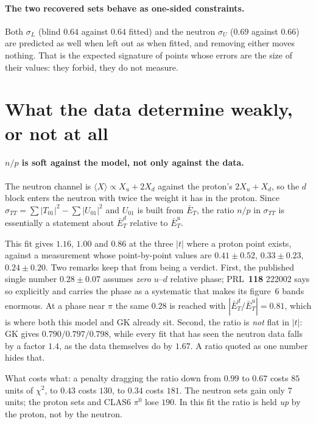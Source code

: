 \documentclass[11pt,a4paper]{article}
\newcommand{\sig}[1]{\sigma_{#1}}
\begin{document}
\paragraph{The two recovered sets behave as one-sided constraints.}  Both
$\sig{L}$ (blind $0.64$ against $0.64$ fitted) and the neutron $\sig{U}$
($0.69$ against $0.66$) are predicted as well when left out as when fitted, and
removing either moves nothing.  That is the expected signature of points whose
errors are the size of their values: they forbid, they do not measure.

\section{What the data determine weakly, or not at all}
\label{sec:notmeasured}

\paragraph{$n/p$ is soft against the model, not only against the data.}
The neutron channel is $\langle X\rangle \propto X_u + 2X_d$ against the
proton's $2X_u + X_d$, so the $d$ block enters the neutron with twice the weight
it has in the proton.  Since $\sig{TT} = \sum|T_{01}|^2 - \sum|U_{01}|^2$ and
$U_{01}$ is built from $\bar E_T$, the ratio $n/p$ in $\sig{TT}$ is essentially a
statement about $\bar E_T^d$ relative to $\bar E_T^u$.

This fit gives $1.16$, $1.00$ and $0.86$ at the three $|t|$ where a proton
point exists, against a measurement whose point-by-point values are
$0.41 \pm 0.52$, $0.33 \pm 0.23$, $0.24 \pm 0.20$.  Two remarks keep that from
being a verdict.  First, the published single number $0.28 \pm 0.07$ assumes
\emph{zero} $u$--$d$ relative phase; PRL~\textbf{118} 222002 says so explicitly
and carries the phase as a systematic that makes its figure~6 bands enormous.
At a phase near $\pi$ the same $0.28$ is reached with
$|\bar E_T^d/\bar E_T^u| = 0.81$, which is where both this model and GK already
sit.  Second, the ratio is \emph{not} flat in $|t|$: GK gives
$0.790/0.797/0.798$, while every fit that has seen the neutron data falls by a
factor $1.4$, as the data themselves do by $1.67$.  A ratio quoted as one
number hides that.

What costs what: a penalty dragging the ratio down from $0.99$ to $0.67$ costs
$85$ units of $\chi^2$, to $0.43$ costs $130$, to $0.34$ costs $181$.  The
neutron sets gain only $7$ units; the proton sets and CLAS6 $\pi^0$ lose $190$.
In this fit the ratio is held \emph{up} by the proton, not by the neutron.
\end{document}
